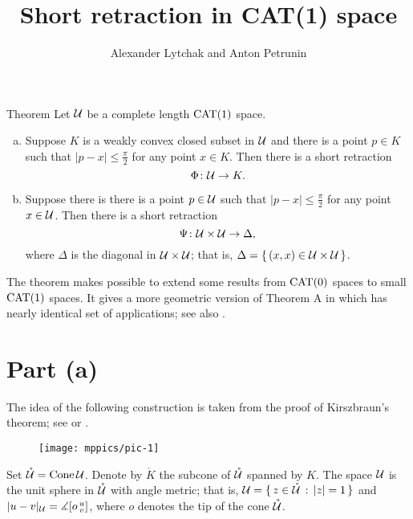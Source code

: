 \documentclass[oneside,a4paper, 12pt]{article}
\begin{document}
\title{Short retraction in CAT(1) space}
\author{Alexander Lytchak and Anton Petrunin}
\maketitle

\begin{thm}{Theorem}\label{thm:retraction}
Let $\mathcal{U}$ be a complete length $\mathrm{CAT}(1)$
space.
\begin{enumerate}[(a)]
\item\label{thm:retraction:Phi} Suppose $K$ is a weakly convex closed subset in $\mathcal{U}$ and there is a point $p\in K$ such that $|p-x|\le \tfrac\pi2$ for any point $x\in K$.
Then there is a short retraction 
\[\Phi\colon\mathcal{U}\to K.\]
\item\label{thm:retraction:Psi} Suppose there is there is a point $p\in \mathcal{U}$ such that $|p-x|\le \tfrac\pi2$ for any point $x\in \mathcal{U}$.
Then there is a short retraction 
\[\Psi\colon\mathcal{U}\times \mathcal{U}\to \Delta,\]
 where $\Delta$ is the diagonal in $\mathcal{U}\times \mathcal{U}$;
 that is, $\Delta=\{\,(x,x)\in \mathcal{U}\times \mathcal{U}\,\}$.
\end{enumerate}

\end{thm}

The theorem makes possible to extend some results from $\mathrm{CAT}(0)$ spaces to small $\mathrm{CAT}(1)$ spaces.
It gives a more geometric version of Theorem A in \cite{yokota} which has nearly identical set of applications; see also \cite[(4.1)]{kendall}.  


\section{Part (a)}

The idea of the following construction is taken from the proof of Kirszbraun's theorem; see \cite[5.1]{akp-kirszbraun} or \cite[9.4.1]{akp}. %

\begin{wrapfigure}{o}{55 mm}
\centering
\texttt{[image: mppics/pic-1]}
\caption{}\label{pic-1}
\end{wrapfigure}

Set $\mathring{\mathcal{U}}=\mathop{\rm Cone}\nolimits \mathcal{U}$.
Denote by $\mathring{K}$ the subcone of $\mathring{\mathcal{U}}$ spanned by $K$.
The space $\mathcal{U}$ is the unit sphere in $\mathring{\mathcal{U}}$ with angle metric;
that is, $\mathcal{U}=\{\,{z\in \mathring{\mathcal{U}}}\,:\,{|z|=1}\,\}$ and $|u-v|_{\mathcal{U}}=\measuredangle[o\,{}^u_v]$, where $o$ denotes the tip of the cone $\mathring{\mathcal{U}}$.
\end{document}
